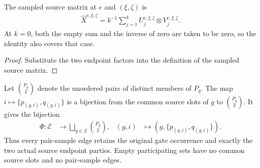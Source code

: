 \begin{theorem}
    \label{thm:peps_sampled_source_factors}
    \leanok
    The sampled source matrix at $e$ and $(\xi,\zeta)$ is
    \begin{align}
        \widehat X^{e,\xi,\zeta}
        =k^{-1}\sum_{j=1}^{k}
          U^{e,\xi,\zeta}_j\otimes V^{e,\xi,\zeta}_j.
        \label{eq:peps_sampled_source_factors}
    \end{align}
    At $k=0$, both the empty sum and the inverse of zero are taken to be
    zero, so the identity also covers that case.
\end{theorem}

\begin{proof}\leanok
    Substitute the two endpoint factors into the definition of the sampled
    source matrix.
\end{proof}

\begin{theorem}
    \label{thm:peps_sampled_source_pairs}
    \leanok
    Let $\binom{P_g}{2}$ denote the unordered pairs of distinct members of
    $P_g$. The map $i\mapsto\{p_{(g,i)},q_{(g,i)}\}$ is a bijection from
    the common source slots of $g$ to $\binom{P_g}{2}$. It gives the
    bijection
    \begin{align}
        \Phi:\mathcal E&\longrightarrow
           \bigsqcup_{g\in\mathcal G}\binom{P_g}{2}, &
        (g,i)&\longmapsto(g,\{p_{(g,i)},q_{(g,i)}\}).
        \label{eq:peps_sampled_source_pairs}
    \end{align}
    Thus every pair-sample edge retains the original gate occurrence and
    exactly the two actual source endpoint parties. Empty participating
    sets have no common source slots and no pair-sample edges.
\end{theorem}

